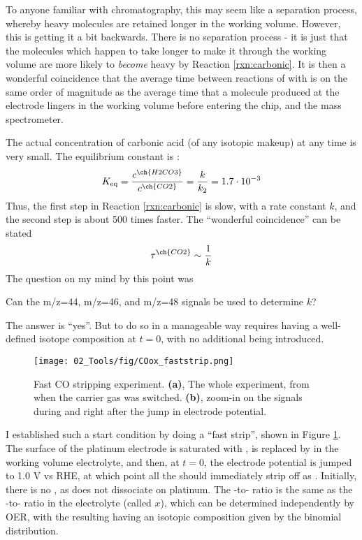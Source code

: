 To anyone familiar with chromatography, this may seem like a separation process, whereby heavy  molecules are retained longer in the working volume. However, this is getting it a bit backwards. There is no separation process - it is just that the  molecules which happen to take longer to make it through the working volume are more likely to \textit{become} heavy by Reaction \ref{rxn:carbonic}. It is then a wonderful coincidence that the average time between reactions of  with  is on the same order of magnitude as the average time that a  molecule produced at the electrode lingers in the working volume before entering the chip, and the mass spectrometer.

The actual concentration of carbonic acid (of any isotopic makeup) at any time is very small. The equilibrium constant is \cite{CRC2015}:
\begin{equation}
K_\text{eq} = \frac{c^{\ch{H2CO3}}}{c^{\ch{CO2}}} = \frac{k}{k_2} = 1.7\cdot 10^{-3}
\end{equation}
Thus, the first step in Reaction \ref{rxn:carbonic} is slow, with a rate constant $k$, and the second step is about 500 times faster. The ``wonderful coincidence'' can be stated
\begin{equation}
\tau^{\ch{CO2}}\sim\frac{1}{k}
\end{equation}
The question on my mind by this point was
\begin{question}
Can the m/z=44, m/z=46, and m/z=48 signals be used to determine $k$?
\end{question}
The answer is ``yes''. But to do so in a manageable way requires having a well-defined isotope composition at $t=0$, with no additional  being introduced.
\begin{figure}[h!]
	\centering
	\texttt{[image: 02\_Tools/fig/COox\_faststrip.png]}
	\caption{Fast CO stripping experiment. \textbf{(a)}, The whole experiment, from when the carrier gas was switched. \textbf{(b)}, zoom-in on the  signals during and right after the jump in electrode potential.}
	\label{fig:COox_faststrip}
\end{figure}
I established such a start condition by doing a ``fast  strip'', shown in Figure \ref{fig:COox_faststrip}. The surface of the platinum electrode is saturated with ,  is replaced by  in the working volume electrolyte, and then, at $t=0$, the electrode potential is jumped to 1.0 V vs RHE, at which point all the  should immediately strip off as . Initially, there is no , as  does not dissociate on platinum. The -to- ratio is the same as the -to- ratio in the electrolyte (called $x$), which can be determined independently by OER, with the resulting  having an isotopic composition given by the binomial distribution.

